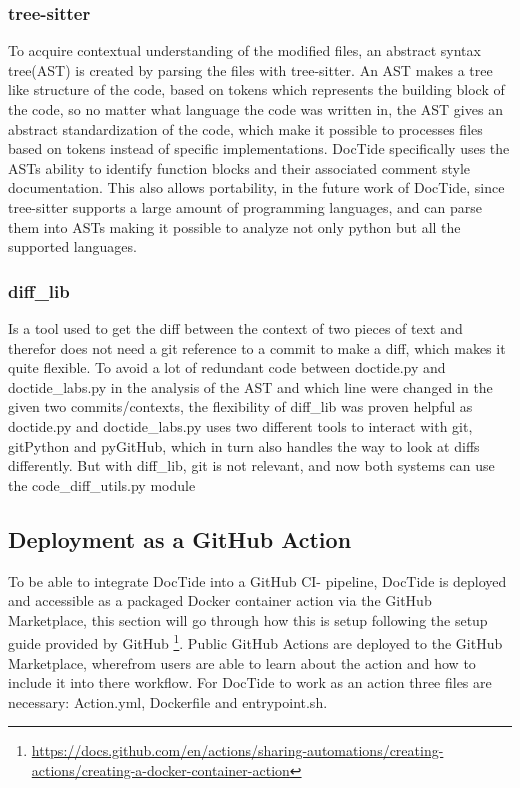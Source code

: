 \subsubsection*{tree-sitter}
\label{sec:tree-sitter}
To acquire contextual understanding of the modified files, an abstract syntax tree(AST) is created by parsing the files with tree-sitter. An AST makes a tree like structure of the code, based on tokens which represents the building block of the code, so no matter what language the code was written in, the AST gives an abstract standardization of the code, which make it possible to processes files based on tokens instead of specific implementations. DocTide specifically uses the ASTs ability to identify function blocks and their associated comment style documentation. This also allows portability, in the future work of DocTide, since tree-sitter supports a large amount of programming languages, and can parse them into ASTs making it possible to analyze not only python but all the supported languages.

\subsubsection*{diff\_lib}
\label{sec:difflib}
Is a tool used to get the diff between the context of two pieces of text and therefor does not need a git reference to a commit to make a diff, which makes it quite flexible. To avoid a lot of redundant code between doctide.py and doctide\_labs.py in the analysis of the AST and which line were changed in the given two commits/contexts, the flexibility of diff\_lib was proven helpful as doctide.py and doctide\_labs.py uses two different tools to interact with git, gitPython and pyGitHub, which in turn also handles the way to look at diffs differently. But with diff\_lib, git is not relevant, and now both systems can use the code\_diff\_utils.py module

\subsection{Deployment as a GitHub Action}
To be able to integrate DocTide into a GitHub CI- pipeline, DocTide is deployed and accessible as a packaged Docker container action via the GitHub Marketplace, this section will go through how this is setup following the setup guide provided by GitHub \footnote{\url{https://docs.github.com/en/actions/sharing-automations/creating-actions/creating-a-docker-container-action}}. Public GitHub Actions are deployed to the GitHub Marketplace, wherefrom users are able to learn about the action and how to include it into there workflow. For DocTide to work as an action three files are necessary: Action.yml, Dockerfile and entrypoint.sh. 

